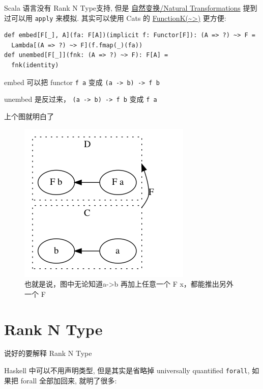 \documentclass[11pt]{tufte-book}
\begin{document}
Scala 语言没有 Rank N Type支持, 但是 \hyperref[org75e4d4a]{自然变换/Natural Transformations} 提到过可以用 \texttt{apply} 来模拟. 其实可以使用 Cats 的 \href{https://typelevel.org/cats/datatypes/functionk.html}{FunctionK(\textasciitilde{}>)} 更方便:
\begin{verbatim}
def embed[F[_], A](fa: F[A])(implicit f: Functor[F]): (A => ?) ~> F =
  Lambda[(A => ?) ~> F](f.fmap(_)(fa))
def unembed[F[_]](fnk: (A => ?) ~> F): F[A] =
  fnk(identity)
\end{verbatim}

embed 可以把 functor \texttt{f a} 变成 \texttt{(a -> b) -> f b}

unembed 是反过来， \texttt{(a -> b) -> f b} 变成 \texttt{f a}

上个图就明白了
\begin{figure}[htbp]
\centering
\includegraphics[width=.9\linewidth]{images/yoneda-lemma.png}
\caption{也就是说，图中无论知道a->b 再加上任意一个 F x，都能推出另外一个 F}
\end{figure}

\section{Rank N Type}
\label{sec:orgd750076}

说好的要解释 Rank N Type

Haskell 中可以不用声明类型, 但是其实是省略掉 universally quantified \texttt{forall}, 如果把 forall 全部加回来,
就明了很多:
\end{document}

